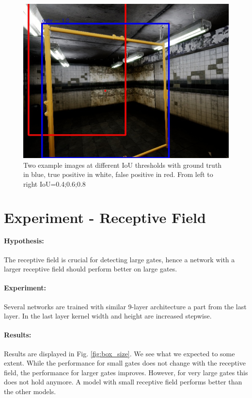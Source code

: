 \documentclass{article}
\begin{document}
\begin{figure}[htbp]
\begin{minipage}{0.3\linewidth}
		\includegraphics[width=\linewidth]{0021-08.jpg}
	\end{minipage}
	\caption{Two example images at different IoU thresholds with ground truth in blue, true positive in white, false positive in red. From left to right IoU=0.4;0.6;0.8}
	\label{fig:iou}
\end{figure}

\section{Experiment - Receptive Field}

\paragraph{Hypothesis:} The receptive field is crucial for detecting large gates, hence a network with a larger receptive field should perform better on large gates.

\paragraph{Experiment:} Several networks are trained with similar 9-layer architecture a part from the last layer. In the last layer kernel width and height are increased stepwise.

\paragraph{Results:} Results are displayed in Fig. \ref{fig:box_size}. We see what we expected to some extent. While the performance for small gates does not change with the receptive field, the performance for larger gates improves. However, for very large gates this does not hold anymore. A model with small receptive field performs better than the other models.
\end{document}
